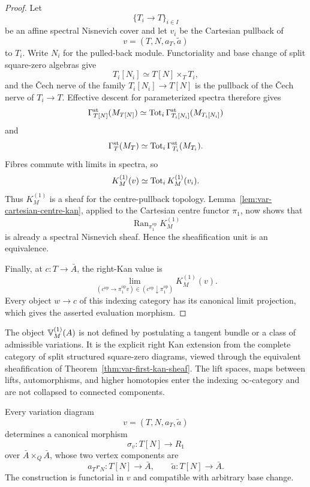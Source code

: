 \begin{proof}
Let
\[
    \{T_i\to T\}_{i\in I}
\]
be an affine spectral Nisnevich cover and let \(v_i\) be the Cartesian pullback of
\[
    v=(T,N,a_T,\widetilde a)
\]
to \(T_i\). Write \(N_i\) for the pulled-back module. Functoriality and base change of split square-zero algebras give
\[
    T_i[N_i]\simeq T[N]\times_TT_i,
\]
and the Čech nerve of the family \(T_i[N_i]\to T[N]\) is the pullback of the Čech nerve of \(T_i\to T\). Effective descent for parameterized spectra therefore gives
\[
    \Gamma_{T[N]}^{\mathrm{st}}(M_{T[N]})
    \simeq
    \operatorname{Tot}_i
    \Gamma_{T_i[N_i]}^{\mathrm{st}}(M_{T_i[N_i]})
\]
and
\[
    \Gamma_T^{\mathrm{st}}(M_T)
    \simeq
    \operatorname{Tot}_i
    \Gamma_{T_i}^{\mathrm{st}}(M_{T_i}).
\]
Fibres commute with limits in spectra, so
\[
    K_M^{(1)}(v)
    \simeq
    \operatorname{Tot}_iK_M^{(1)}(v_i).
\]
Thus \(K_M^{(1)}\) is a sheaf for the centre-pullback topology. Lemma~\ref{lem:var-cartesian-centre-kan}, applied to the Cartesian centre functor \(\pi_1\), now shows that
\[
    \operatorname{Ran}_{\pi_1^{\mathrm{op}}}K_M^{(1)}
\]
is already a spectral Nisnevich sheaf. Hence the sheafification unit is an equivalence.

Finally, at \(c:T\to\bar A\), the right-Kan value is
\[
    \lim_{(c^{\mathrm{op}}\to\pi_1^{\mathrm{op}}v)\in(c^{\mathrm{op}}\downarrow\pi_1^{\mathrm{op}})}
    K_M^{(1)}(v).
\]
Every object \(w\to c\) of this indexing category has its canonical limit projection, which gives the asserted evaluation morphism.
\end{proof}

\begin{remark}
\label{rem:var-no-first-datum}
The object \(\mathbb V^{(1)}_M(A)\) is not defined by postulating a tangent bundle or a class of admissible variations. It is the explicit right Kan extension from the complete category of split structured square-zero diagrams, viewed through the equivalent sheafification of Theorem~\ref{thm:var-first-kan-sheaf}. The lift spaces, maps between lifts, automorphisms, and higher homotopies enter the indexing \(\infty\)-category and are not collapsed to connected components.
\end{remark}

\begin{proposition}
\label{prop:var-sqz-to-relation}
Every variation diagram
\[
    v=(T,N,a_T,\widetilde a)
\]
determines a canonical morphism
\[
    \boxed{
    \sigma_v:T[N]\longrightarrow R_1
    }
\]
over \(\bar A\times_Q\bar A\), whose two vertex components are
\[
    a_Tr_N:T[N]\longrightarrow\bar A,
    \qquad
    \widetilde a:T[N]\longrightarrow\bar A.
\]
The construction is functorial in \(v\) and compatible with arbitrary base change.
\end{proposition}

